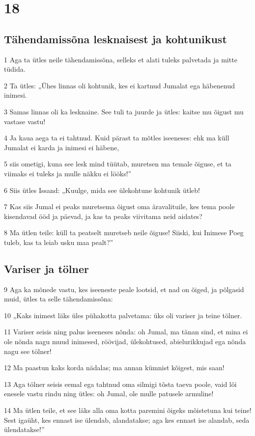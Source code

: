 \chapter{18}

\section*{Tähendamissõna lesknaisest ja kohtunikust}

\par 1 Aga ta ütles neile tähendamissõna, selleks et alati tuleks palvetada ja mitte tüdida.
\par 2 Ta ütles: „Ühes linnas oli kohtunik, kes ei kartnud Jumalat ega häbenenud inimesi.
\par 3 Samas linnas oli ka lesknaine. See tuli ta juurde ja ütles: kaitse mu õigust mu vastase vastu!
\par 4 Ja kaua aega ta ei tahtnud. Kuid pärast ta mõtles iseeneses: ehk ma küll Jumalat ei karda ja inimesi ei häbene,
\par 5 siis ometigi, kuna see lesk mind tüütab, muretsen ma temale õiguse, et ta viimaks ei tuleks ja mulle näkku ei lööks!”
\par 6 Siis ütles Issand: „Kuulge, mida see ülekohtune kohtunik ütleb!
\par 7 Kas siis Jumal ei peaks muretsema õigust oma äravalituile, kes tema poole kisendavad ööd ja päevad, ja kas ta peaks viivitama neid aidates?
\par 8 Ma ütlen teile: küll ta peatselt muretseb neile õiguse! Siiski, kui Inimese Poeg tuleb, kas ta leiab usku maa pealt?”

\section*{Variser ja tölner}

\par 9 Aga ka mõnede vastu, kes iseeneste peale lootsid, et nad on õiged, ja põlgasid muid, ütles ta selle tähendamissõna:
\par 10 „Kaks inimest läks üles pühakotta palvetama: üks oli variser ja teine tölner.
\par 11 Variser seisis ning palus iseeneses nõnda: oh Jumal, ma tänan sind, et mina ei ole nõnda nagu muud inimesed, röövijad, ülekohtused, abielurikkujad ega nõnda nagu see tölner!
\par 12 Ma paastun kaks korda nädalas; ma annan kümnist kõigest, mis saan!
\par 13 Aga tölner seisis eemal ega tahtnud oma silmigi tõsta taeva poole, vaid lõi enesele vastu rindu ning ütles: oh Jumal, ole mulle patusele armuline!
\par 14 Ma ütlen teile, et see läks alla oma kotta paremini õigeks mõistetuna kui teine! Sest igaüht, kes ennast ise ülendab, alandatakse; aga kes ennast ise alandab, seda ülendatakse!”

